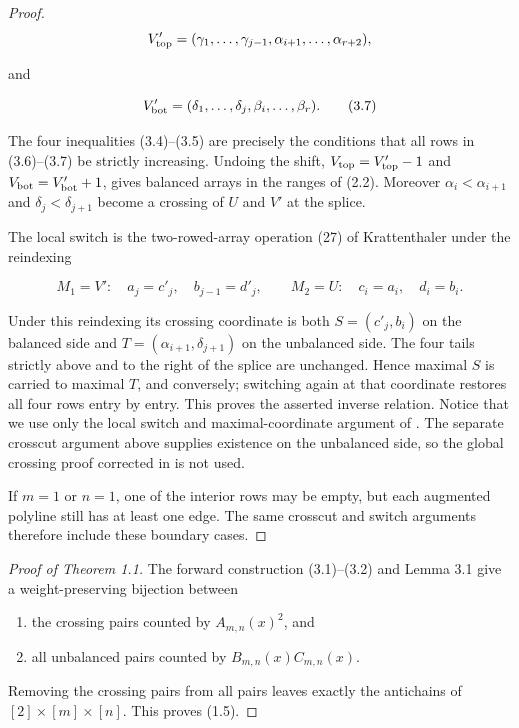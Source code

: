 \documentclass[11pt]{article}
\numberwithin{equation}{section}
\begin{document}
\begin{proof}
\nopagebreak[4]
\[
V'_{\rm top}=(\gamma_1,\ldots,\gamma_{j-1},
               \alpha_{i+1},\ldots,\alpha_{r+2}),
\]

and

\nopagebreak[4]
\[
V'_{\rm bot}=(\delta_1,\ldots,\delta_j,
               \beta_i,\ldots,\beta_r).
\tag{3.7}
\]

The four inequalities (3.4)--(3.5) are precisely the conditions that all rows
in (3.6)--(3.7) be strictly increasing. Undoing the shift,
$V_{\rm top}=V'_{\rm top}-1$ and $V_{\rm bot}=V'_{\rm bot}+1$, gives balanced
arrays in the ranges of (2.2). Moreover
$\alpha_i<\alpha_{i+1}$ and $\delta_j<\delta_{j+1}$ become a crossing of $U$
and $V'$ at the splice.

The local switch is the two-rowed-array operation (27) of Krattenthaler \cite{krattenthaler1995}
under the reindexing

\nopagebreak[4]
\[
M_1=V':\quad a_j=c'_j,\quad b_{j-1}=d'_j,
\qquad
M_2=U:\quad c_i=a_i,\quad d_i=b_i.
\]

Under this reindexing its crossing coordinate is both
$S=(c'_j,b_i)$ on the balanced side and
$T=(\alpha_{i+1},\delta_{j+1})$ on the unbalanced side. The four tails strictly
above and to the right of the splice are unchanged. Hence maximal $S$ is carried
to maximal $T$, and conversely; switching again at that coordinate restores all
four rows entry by entry. This proves the asserted inverse relation. Notice that
we use only the local switch and maximal-coordinate argument of \cite{krattenthaler1995}. The separate
crosscut argument above supplies existence on the unbalanced side, so the global
crossing proof corrected in \cite{rubey} is not used.

If $m=1$ or $n=1$, one of the interior rows may be empty, but each augmented
polyline still has at least one edge. The same crosscut and switch arguments
therefore include these boundary cases.
\end{proof}


\begin{proof}[Proof of Theorem 1.1]

The forward construction (3.1)--(3.2) and Lemma 3.1 give a weight-preserving
bijection between

\begin{enumerate}
\item the crossing pairs counted by $A_{m,n}(x)^2$, and
\item all unbalanced pairs counted by $B_{m,n}(x)C_{m,n}(x)$.

\end{enumerate}

Removing the crossing pairs from all pairs leaves exactly the antichains of
$[2]\times[m]\times[n]$. This proves (1.5).
\end{proof}
\end{document}
